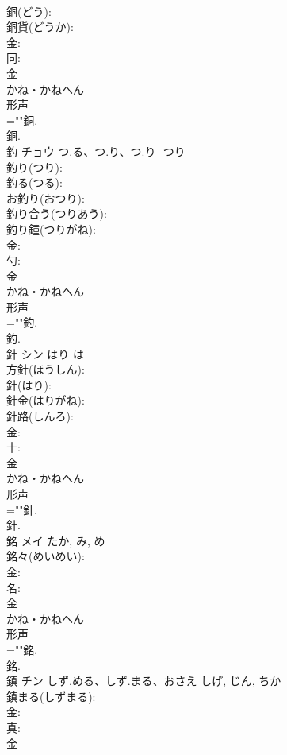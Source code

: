 \documentclass[8pt]{extreport}
\begin{document}
\begin{CJK}{UTF8}{min}
\\	銅(どう): 
\\	銅貨(どうか): 
\\	金: 
\\	同: 
\\	金	
\\	かね・かねへん	
\\	形声 
\\	=""銅.
\\	銅.
\\	釣	チョウ	つ.る、つ.り、つ.り-	つり	
\\	釣り(つり): 
\\	釣る(つる): 
\\	お釣り(おつり): 
\\	釣り合う(つりあう): 
\\	釣り鐘(つりがね): 
\\	金: 
\\	勺: 
\\	金	
\\	かね・かねへん	
\\	形声 
\\	=""釣.
\\	釣.
\\	針	シン	はり	は	
\\	方針(ほうしん): 
\\	針(はり): 
\\	針金(はりがね): 
\\	針路(しんろ): 
\\	金: 
\\	十: 
\\	金	
\\	かね・かねへん	
\\	形声 
\\	=""針.
\\	針.
\\	銘	メイ		たか, み, め	
\\	銘々(めいめい): 
\\	金: 
\\	名: 
\\	金	
\\	かね・かねへん	
\\	形声 
\\	=""銘.
\\	銘.
\\	鎮	チン	しず.める、しず.まる、おさえ	しげ, じん, ちか	
\\	鎮まる(しずまる): 
\\	金: 
\\	真: 
\\	金	

\end{CJK}
\end{document}
